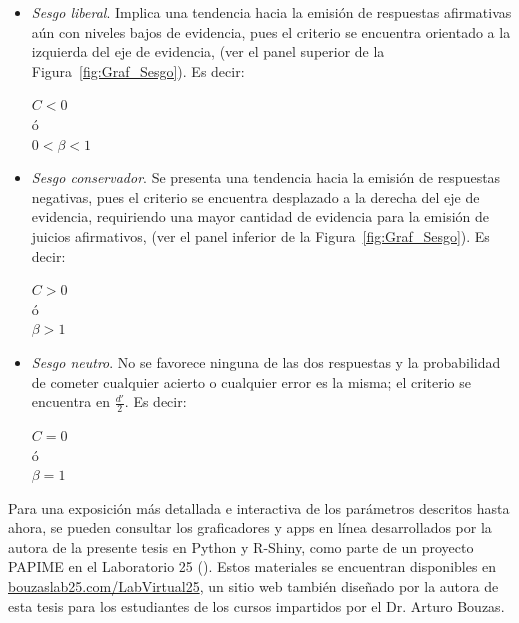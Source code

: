 \begin{itemize}
\item \textsl{Sesgo liberal}. Implica una tendencia hacia la emisión de respuestas afirmativas aún con niveles bajos de evidencia, pues el criterio se encuentra orientado a la izquierda del eje de evidencia, (ver el panel superior de la Figura~\ref{fig:Graf_Sesgo}). Es decir: \\
\begin{center}
$C < 0$\\
ó\\
$0 < \beta < 1$\\
\end{center}

\item \textsl{Sesgo conservador}. Se presenta una tendencia hacia la emisión de respuestas negativas, pues el criterio se encuentra desplazado a la derecha del eje de evidencia, requiriendo una mayor cantidad de evidencia para la emisión de juicios afirmativos, (ver el panel inferior de la Figura~\ref{fig:Graf_Sesgo}). Es decir: \\
\begin{center}
$C > 0$\\
ó\\
$\beta > 1$\\
\end{center}

\item \textsl{Sesgo neutro}. No se favorece ninguna de las dos respuestas y la probabilidad de cometer cualquier acierto o cualquier error es la misma; el criterio se encuentra en $\frac{d'}{2}$. Es decir: \\
\begin{center}
$C = 0$\\
ó\\
$\beta = 1$\\
\end{center}
\end{itemize}

Para una exposición más detallada e interactiva de los parámetros descritos hasta ahora, se pueden consultar los graficadores y apps en línea desarrollados por la autora de la presente tesis en Python y R-Shiny, como parte de un proyecto PAPIME en el Laboratorio 25 (\citeyear{PAPIME}). Estos materiales se encuentran disponibles en \href{http://www.bouzaslab25.com/LabVirtual25/}{bouzaslab25.com/LabVirtual25}, un sitio web también diseñado por la autora de esta tesis para los estudiantes de los cursos impartidos por el Dr. Arturo Bouzas.\\

